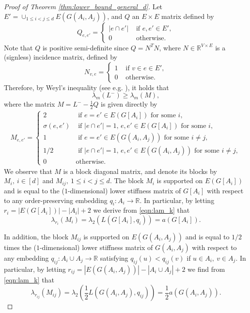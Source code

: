 \documentclass[a4paper,11pt]{article}
\theoremstyle{plain}
\theoremstyle{definition}
\newcommand{\Rea}{{\mathbb R}}
\begin{document}
\begin{proof}[Proof of Theorem \ref{thm:lower_bound_general_d}]
Let $E'=\cup_{1\leq i<j\leq d} E(G(A_i,A_j))$, and $Q$ an $E\times E$ matrix defined by
\[
Q_{e,e'}=\begin{cases}
 |e\cap e'| & \text{ if } e,e'\in E',\\
 0 & \text{ otherwise.}
\end{cases}
\]
Note that $Q$ is positive semi-definite since $Q=N^TN$, where $N\in \Rea^{V\times E}$ is a (signless) incidence matrix, defined by
\[
    N_{v,e}=\begin{cases}
     1 & \text{ if } v\in e\in E',\\
     0 & \text{ otherwise}.
    \end{cases}
\]
Therefore, by Weyl's inequality (see e.g. \cite[Theorem 2.8.1(iii)]{brouwer2011spectra}), it holds that
\begin{equation}\label{eqn:L2M}
\lambda_{m}(L^{-})\ge \lambda_{m}(M),
\end{equation}
where the matrix $M=L^- -\frac 12Q$ is given directly by
 \begin{align*}
    M_{e,e'}=\begin{cases}
                    2 & \text{ if } 
					e=e'\in E(G[A_i]) \text{ for some } i,\\                    
                    \sigma(e,e') & \text{ if } |e\cap e'|=1, \, e,e'\in E(G[A_i]) \text{ for some } i,\\
                                        1 & \text{ if }  e=e'\in E(G(A_i,A_j)) \text{ for some } i\neq j,\\
                    1/2 & \text{ if } |e\cap e'|=1,  \, e,e'\in E(G(A_i,A_j)) \text{ for some } i\neq j,\\
                    0 & \text{otherwise}.    
    \end{cases}
 \end{align*}
We observe that $M$ is a block diagonal matrix, and denote its blocks by $M_i,~i\in [d]$ and $M_{ij},~1\le i<j\le d$. The block $M_i$ is supported on $E(G[A_i])$ and is equal to the ($1$-dimensional) lower stiffness matrix of $G[A_i]$ with respect to any order-preserving embedding $q_i:A_i \to \Rea$. In particular, by letting $r_i=|E(G[A_i])|-|A_i|+2$ we derive from \eqref{eqn:lam_k} that
\begin{equation}\label{eqn:aGAi}
\lambda_{r_i}(M_i) = \lambda_2(L(G[A_i],q_i)) = a(G[A_i]).
\end{equation}

In addition, the block $M_{ij}$ is supported on $E(G(A_i,A_j))$ and is equal to $1/2$ times the ($1$-dimensional) lower stiffness matrix of $G(A_i,A_j)$ with respect to any embedding $q_{ij}:A_i \cup A_j \to \Rea$ satisfying $q_{ij}(u)<q_{ij}(v)$ if $u\in A_i,~v\in A_j$. In particular, by letting $r_{ij}=|E(G(A_i,A_j))|-|A_i\cup A_j|+2$ we find from \eqref{eqn:lam_k} that
\begin{equation}\label{eqn:aGAij}
\lambda_{r_{ij}}(M_{ij}) = \lambda_2\left(\frac 12 L(G(A_i,A_j),q_{ij})\right) = \frac 12 a(G(A_i,A_j)).
\end{equation}


\end{proof}
\end{document}
